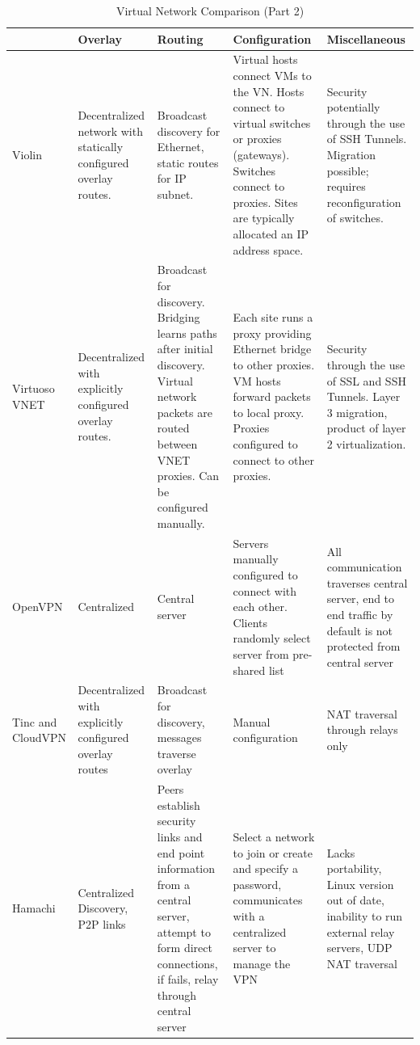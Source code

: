 \begin{table}[ht]
{\small
\centering
\begin{tabular}{|p{.8in}||p{1.25in}|p{1.25in}|p{1.25in}|p{1.25in}|} \hline
& Overlay & Routing & Configuration & Miscellaneous \\ \hline\hline
Violin
&
Decentralized network with statically configured overlay routes.
&
Broadcast discovery for Ethernet, static routes for IP subnet.
&
Virtual hosts connect VMs to the VN.  Hosts connect to virtual switches or
proxies (gateways).  Switches connect to proxies.  Sites are typically
allocated an IP address space.
&
Security potentially through the use of SSH Tunnels.  Migration possible;
requires reconfiguration of switches. 
\\ \hline
Virtuoso VNET
&
Decentralized with explicitly configured overlay routes.
&
Broadcast for discovery.  Bridging learns paths after initial discovery.  Virtual
network packets are routed between VNET proxies.  Can be configured manually.
&
Each site runs a proxy providing Ethernet bridge to other proxies.  VM hosts
forward packets to local proxy.  Proxies configured to connect to other proxies.
&
Security through the use of SSL and SSH Tunnels.  Layer 3 migration, product of
layer 2 virtualization.
\\ \hline
OpenVPN
&
Centralized
&
Central server
&
Servers manually configured to connect with each other.  Clients randomly select
server from pre-shared list
&
All communication traverses central server, end to end traffic by default is not
protected from central server
\\ \hline
Tinc and CloudVPN
&
Decentralized with explicitly configured overlay routes
&
Broadcast for discovery, messages traverse overlay
&
Manual configuration
&
NAT traversal through relays only
\\ \hline
Hamachi
&
Centralized Discovery, P2P links
&
Peers establish security links and end point information from a central
server, attempt to form direct connections, if fails, relay through central
server
&
Select a network to join or create and specify a password, communicates with a
centralized server to manage the VPN
&
Lacks portability, Linux version out of date, inability to run external relay
servers, UDP NAT traversal
\\ \hline
\end{tabular}
}
\caption{Virtual Network Comparison (Part 2)}
\label{tab:virtual_networks_part2}
\end{table}

